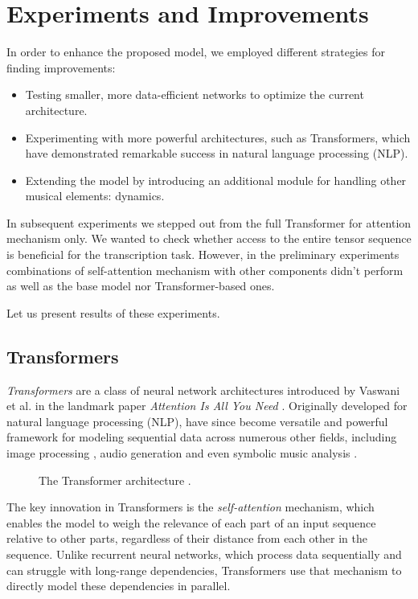 \chapter{Experiments and Improvements}\label{experiments_and_improvements}

In order to enhance the proposed model, we employed different strategies for finding improvements: \begin{itemize}
	\item Testing smaller, more data-efficient networks to optimize the current architecture.
	\item Experimenting with more powerful architectures, such as Transformers, which have demonstrated remarkable success in natural language processing (NLP).
	\item Extending the model by introducing an additional module for handling other musical elements: dynamics. \end{itemize}
	
In subsequent experiments we stepped out from the full Transformer for attention mechanism only. We wanted to check whether access to the entire tensor sequence is beneficial for the transcription task. However, in the preliminary experiments combinations of self-attention mechanism with other components didn't perform as well as the base model nor Transformer-based ones.
	
Let us present results of these experiments.

\section{Transformers}

\emph{Transformers} are a class of neural network architectures introduced by Vaswani et al. in the landmark paper \emph{Attention Is All You Need} \cite{Vaswani2017}. Originally developed for natural language processing (NLP), have since become versatile and powerful framework for modeling sequential data across numerous other fields, including image processing \cite{Dosovitskiy2020}, audio generation \cite{Borsos2023} and even symbolic music analysis \cite{Zhu2021}.

\begin{figure}[ht!]
\centering

\caption[The Transformer architecture.]{The Transformer architecture \cite{Vaswani2017}.}
\end{figure}

The key innovation in Transformers is the \emph{self-attention} mechanism, which enables the model to weigh the relevance of each part of an input sequence relative to other parts, regardless of their distance from each other in the sequence. Unlike recurrent neural networks, which process data sequentially and can struggle with long-range dependencies, Transformers use that mechanism to directly model these dependencies in parallel.

